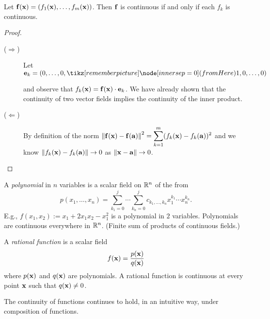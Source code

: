 \begin{theorem}
    Let \(\mathbf{f}(\mathbf{x}) = \left(f_1(\mathbf{x}),\ldots,f_m(\mathbf{x}) \right)\).
    Then \(\mathbf{f}\) is continuous if and only if each \(f_k\) is continuous.
\end{theorem}
\begin{proof}
    \begin{description}
        \item[(\(\Rightarrow\))]
              Let
              \( \ee_k=(0,\ldots,0,\here{1}{fromHere},0,\ldots,0)  \)
              and observe that \(f_k(\mathbf{x}) = \mathbf{f}(\mathbf{x})\cdot \mathbf{e}_k\).
              We have already shown that the continuity of two vector fields implies the continuity of the inner product.
        \item[(\(\Leftarrow \))]
              By definition of the norm
              \(\left\|\mathbf{f}(\mathbf{x})-\mathbf{f}(\mathbf{a})\right\|^2 = \displaystyle\sum_{k=1}^{m}(f_k(\mathbf{x})-f_k(\mathbf{a}))^2\)
              and we know \(\left\|f_k(\mathbf{x})-f_k(\mathbf{a})\right\| \to 0\) as \(\left\|\mathbf{x}-\mathbf{a}\right\|\to 0\). \qedhere
    \end{description}
\end{proof}



\begin{example*}[polynomials]
    A  \emph{polynomial} in \(n\) variables is a scalar field on \(\mathbb{R}^n\) of the from
    \[
        p(x_1,\ldots,x_n)
        = \sum_{k_1=0}^{j}\cdots \sum_{k_n=0}^{j} c_{k_1,\dots,k_n} x_1^{k_1}\cdots x_n^{k_n}.
    \]
    E.g., \(f(x_1,x_2):= x_1 + 2x_1x_2 - x_1^2\) is a polynomial in \(2\) variables.
    Polynomials are continuous everywhere in \(\mathbb{R}^n\). (Finite sum of products of continuous fields.)
\end{example*}

\begin{example*}
    A  \emph{rational function} is a scalar field
    \[
        f(\mathbf{x})=\frac{p(\mathbf{x})}{q(\mathbf{x})}
    \]
    where \(p(\mathbf{x})\) and \(q(\mathbf{x})\) are polynomials.
    A rational function is continuous at every point \(\mathbf{x}\) such that \(q(\mathbf{x})\neq 0\).
\end{example*}

The continuity of functions continues to hold, in an intuitive way, under composition of functions.

